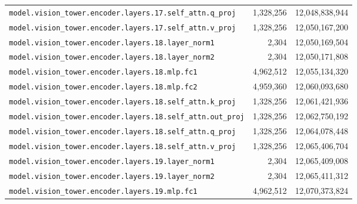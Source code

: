\documentclass[10pt,a4paper]{article}
\theoremstyle{definition}
\begin{document}
\begin{appendices}
\begin{longtable}{p{9.5cm}rr}
\texttt{model.\allowbreak{}vision\_tower.\allowbreak{}encoder.\allowbreak{}layers.\allowbreak{}17.\allowbreak{}self\_attn.\allowbreak{}q\_proj} & 1,328,256 & 12,048,838,944 \\
\texttt{model.\allowbreak{}vision\_tower.\allowbreak{}encoder.\allowbreak{}layers.\allowbreak{}17.\allowbreak{}self\_attn.\allowbreak{}v\_proj} & 1,328,256 & 12,050,167,200 \\
\texttt{model.\allowbreak{}vision\_tower.\allowbreak{}encoder.\allowbreak{}layers.\allowbreak{}18.\allowbreak{}layer\_norm1} & 2,304 & 12,050,169,504 \\
\texttt{model.\allowbreak{}vision\_tower.\allowbreak{}encoder.\allowbreak{}layers.\allowbreak{}18.\allowbreak{}layer\_norm2} & 2,304 & 12,050,171,808 \\
\texttt{model.\allowbreak{}vision\_tower.\allowbreak{}encoder.\allowbreak{}layers.\allowbreak{}18.\allowbreak{}mlp.\allowbreak{}fc1} & 4,962,512 & 12,055,134,320 \\
\texttt{model.\allowbreak{}vision\_tower.\allowbreak{}encoder.\allowbreak{}layers.\allowbreak{}18.\allowbreak{}mlp.\allowbreak{}fc2} & 4,959,360 & 12,060,093,680 \\
\texttt{model.\allowbreak{}vision\_tower.\allowbreak{}encoder.\allowbreak{}layers.\allowbreak{}18.\allowbreak{}self\_attn.\allowbreak{}k\_proj} & 1,328,256 & 12,061,421,936 \\
\texttt{model.\allowbreak{}vision\_tower.\allowbreak{}encoder.\allowbreak{}layers.\allowbreak{}18.\allowbreak{}self\_attn.\allowbreak{}out\_proj} & 1,328,256 & 12,062,750,192 \\
\texttt{model.\allowbreak{}vision\_tower.\allowbreak{}encoder.\allowbreak{}layers.\allowbreak{}18.\allowbreak{}self\_attn.\allowbreak{}q\_proj} & 1,328,256 & 12,064,078,448 \\
\texttt{model.\allowbreak{}vision\_tower.\allowbreak{}encoder.\allowbreak{}layers.\allowbreak{}18.\allowbreak{}self\_attn.\allowbreak{}v\_proj} & 1,328,256 & 12,065,406,704 \\
\texttt{model.\allowbreak{}vision\_tower.\allowbreak{}encoder.\allowbreak{}layers.\allowbreak{}19.\allowbreak{}layer\_norm1} & 2,304 & 12,065,409,008 \\
\texttt{model.\allowbreak{}vision\_tower.\allowbreak{}encoder.\allowbreak{}layers.\allowbreak{}19.\allowbreak{}layer\_norm2} & 2,304 & 12,065,411,312 \\
\texttt{model.\allowbreak{}vision\_tower.\allowbreak{}encoder.\allowbreak{}layers.\allowbreak{}19.\allowbreak{}mlp.\allowbreak{}fc1} & 4,962,512 & 12,070,373,824 \\

\end{longtable}
\end{appendices}
\end{document}
